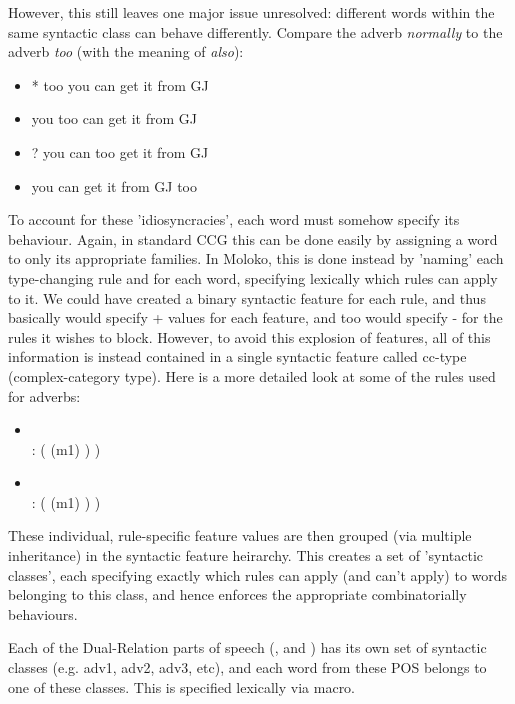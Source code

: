 However, this still leaves one major issue unresolved: different words within the same
syntactic class can behave differently. Compare the adverb \emph{normally} to the adverb \emph{too}
(with the meaning of  \emph{also}):
\begin{itemize}
\item	* too you can get it from GJ
\item	you too can get it from GJ
\item	? you can too get it from GJ
\item	you can get it from GJ too
\end{itemize}
To account for these 'idiosyncracies', each word must somehow specify its behaviour. Again, in standard \textsc{CCG} this can be done easily by assigning a word to only its appropriate families. In Moloko, this is done instead by 'naming' each type-changing rule and for each word, specifying lexically which rules can apply to it. We could have created a binary syntactic feature for each rule, and thus basically would specify + values for each feature, and too would specify - for the rules it wishes to block. However, to
avoid this explosion of features, all of this information is instead contained in a single syntactic feature called cc-type (complex-category type). Here is a more detailed look at some of the rules used for adverbs:
\begin{itemize}
\item {}    \arrow  \\  : (  (m1) ) ) 
\item {}   \arrow \\  : (  (m1) ) )
\end{itemize}
These individual, rule-specific feature values are then grouped (via multiple inheritance) in the syntactic feature heirarchy. This creates a set of 'syntactic classes', each  specifying exactly which rules can apply (and can't apply) to words belonging to this class, and hence enforces the appropriate combinatorially behaviours. 

Each of the Dual-Relation parts of speech (,  and ) has its own set of syntactic classes (e.g. adv1, adv2, adv3, etc), and each word from these POS belongs to one of these classes. This is specified lexically via macro. 
